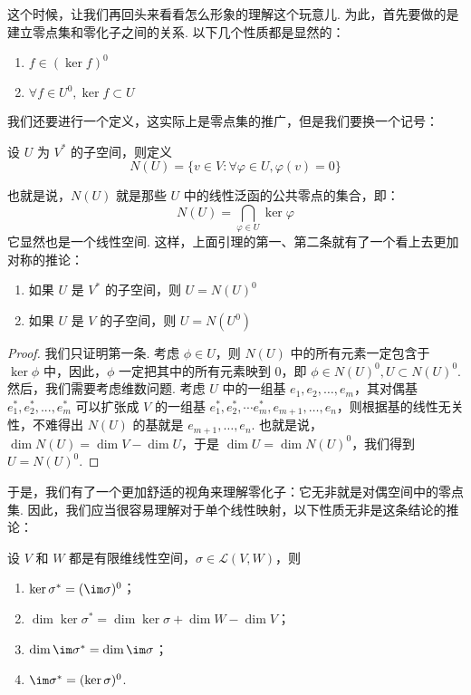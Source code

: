 这个时候，让我们再回头来看看怎么形象的理解这个玩意儿. 为此，首先要做的是建立零点集和零化子之间的关系. 以下几个性质都是显然的：

\begin{lemma}{}{}
    \begin{enumerate}
        \item $f \in (\ker f)^0$
        \item $\forall f \in U^0, \ker f \subset U$
    \end{enumerate}
\end{lemma}

我们还要进行一个定义，这实际上是零点集的推广，但是我们要换一个记号：

\begin{definition}{}{}
    设 $U$ 为 $V^*$ 的子空间，则定义
    \[
        N(U) = \{v \in V: \forall \varphi \in U, \varphi(v) = 0\}
    \]
\end{definition}

也就是说，$N(U)$ 就是那些 $U$ 中的线性泛函的公共零点的集合，即：
\[
    N(U) = \bigcap_{\varphi \in U} \ker \varphi
\]
它显然也是一个线性空间. 这样，上面引理的第一、第二条就有了一个看上去更加对称的推论：

\begin{lemma}{}{}
    \begin{enumerate}
        \item 如果 $U$ 是 $V^*$ 的子空间，则 $U = N(U)^0$
        \item 如果 $U$ 是 $V$ 的子空间，则 $U = N(U^0)$
    \end{enumerate}
\end{lemma}

\begin{proof}
    我们只证明第一条. 考虑 $\phi \in U$，则 $N(U)$ 中的所有元素一定包含于 $\ker \phi$ 中，因此，$\phi$ 一定把其中的所有元素映到 $0$，即 $\phi \in N(U)^0, U \subset N(U)^0$. 然后，我们需要考虑维数问题. 考虑 $U$ 中的一组基 $e_1, e_2,\ldots, e_m$，其对偶基 $e_1^*, e_2^*, ..., e_m^*$ 可以扩张成 $V$ 的一组基 $e_1^*, e_2^*, \cdots e_m^*, e_{m + 1},\ldots, e_n$，则根据基的线性无关性，不难得出 $N(U)$ 的基就是 $e_{m + 1},\ldots, e_n$. 也就是说，$\dim N(U) = \dim V - \dim U$，于是 $\dim U = \dim N(U)^0$，我们得到 $U = N(U)^0$.
\end{proof}

于是，我们有了一个更加舒适的视角来理解零化子：它无非就是对偶空间中的零点集. 因此，我们应当很容易理解对于单个线性映射，以下性质无非是这条结论的推论：

\begin{theorem}{}{}
    设 $V$ 和 $W$ 都是有限维线性空间，$\sigma\in\mathcal{L}(V,W)$，则
    \begin{enumerate}
        \item $\ker\sigma^*=(\im\sigma)^0$；
        \item $\dim\ker\sigma^*=\dim\ker\sigma+\dim W-\dim V$；
        \item $\dim\im\sigma^*=\dim\im\sigma$；
        \item $\im\sigma^*=(\ker\sigma)^0$.
    \end{enumerate}
\end{theorem}


